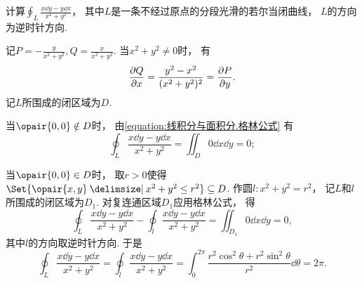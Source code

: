 \begin{example}
计算\(\oint_L \frac{x\dd{y}-y\dd{x}}{x^2+y^2}\)，
其中\(L\)是一条不经过原点的分段光滑的若尔当闭曲线，
\(L\)的方向为逆时针方向.
\begin{solution}
记\(P = -\frac{y}{x^2+y^2}, Q = \frac{x}{x^2+y^2}\).
当\(x^2+y^2\neq0\)时，
有\[
	\pdv{Q}{x} = \frac{y^2-x^2}{(x^2+y^2)^2} = \pdv{P}{y}.
\]
记\(L\)所围成的闭区域为\(D\).

当\(\opair{0,0} \notin D\)时，
由\cref{equation:线积分与面积分.格林公式} 有\[
	\oint_L \frac{x\dd{y}-y\dd{x}}{x^2+y^2} = \iint_D 0 \dd{x}\dd{y} = 0;
\]

当\(\opair{0,0} \in D\)时，
取\(r>0\)使得\(\Set{ \opair{x,y} \given x^2+y^2 \leq r^2 } \subseteq D\).
作圆\(l: x^2+y^2=r^2\)，
记\(L\)和\(l\)所围成的闭区域为\(D_1\).
对复连通区域\(D_1\)应用格林公式，
得\[
	\oint_L \frac{x\dd{y}-y\dd{x}}{x^2+y^2} - \oint_l \frac{x\dd{y}-y\dd{x}}{x^2+y^2}
	= \iint_{D_1} 0 \dd{x}\dd{y} = 0,
\]
其中\(l\)的方向取逆时针方向.
于是\[
\oint_L \frac{x\dd{y}-y\dd{x}}{x^2+y^2}
= \oint_l \frac{x\dd{y}-y\dd{x}}{x^2+y^2}
= \int_0^{2\pi} \frac{r^2 \cos^2\theta + r^2 \sin^2\theta}{r^2} \dd{\theta}
= 2\pi.
\]
\end{solution}
\end{example}

